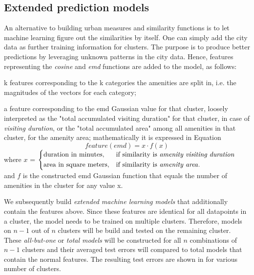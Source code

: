 \subsection{Extended prediction models}
\label{evaluation:machine_learning_better}
An alternative to building urban measures and similarity functions is to let machine learning figure out the similarities by itself. One can simply add the city data as further training information for clusters. The purpose is to produce better predictions by leveraging unknown patterns in the city data. Hence, features representing the \textit{cosine} and \textit{emd} functions are added to the model, as follows: 
\begin{romanlist}
	\item k features corresponding to the k categories the amenities are split in, i.e. the magnitudes of the vectors for each category;
	\item a feature corresponding to the emd Gaussian value for that cluster, loosely interpreted as the "total accumulated visiting duration" for that cluster, in case of \textit{visiting duration}, or the "total accumulated area" among all amenities in that cluster, for the amenity area; mathematically it is expressed in Equation 
	\begin{equation}
		feature(emd)=x \cdot f(x)
		\label{eq:emd_gaussian_magnitude}
	\end{equation}
	{\centering
	where $x$ = 
	$
	\begin{dcases}
	\text{duration in minutes}, & \text{if similarity is \textit{amenity visiting duration}} \\
	\text{area in square meters}, & \text{if similarity is \textit{amenity area}}.
	\end{dcases}
	$ \\
	and $f$ is the constructed emd Gaussian function that equals the number of amenities in the cluster for any value x.}
\end{romanlist}

We subsequently build \textit{extended machine learning models} that additionally contain the features above. Since these features are identical for all datapoints in a cluster, the model needs to be trained on multiple clusters. Therefore, models on $n-1$ out of $n$ clusters will be build and tested on the remaining cluster. These \textit{all-but-one} or \textit{total models} will be constructed for all $n$ combinations of $n-1$ clusters and their averaged test errors will compared to total models that contain the normal features. The resulting test errors are shown in  for various number of clusters. 

